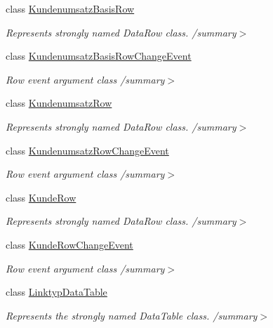 \begin{DoxyCompactItemize}
class \hyperlink{class_products_1_1_data_1_1ds_sage_1_1_kundenumsatz_basis_row}{Kundenumsatz\+Basis\+Row}
\begin{DoxyCompactList}\small\item\em Represents strongly named Data\+Row class. /summary$>$ \end{DoxyCompactList}\item 
class \hyperlink{class_products_1_1_data_1_1ds_sage_1_1_kundenumsatz_basis_row_change_event}{Kundenumsatz\+Basis\+Row\+Change\+Event}
\begin{DoxyCompactList}\small\item\em Row event argument class /summary$>$ \end{DoxyCompactList}\item 
class \hyperlink{class_products_1_1_data_1_1ds_sage_1_1_kundenumsatz_row}{Kundenumsatz\+Row}
\begin{DoxyCompactList}\small\item\em Represents strongly named Data\+Row class. /summary$>$ \end{DoxyCompactList}\item 
class \hyperlink{class_products_1_1_data_1_1ds_sage_1_1_kundenumsatz_row_change_event}{Kundenumsatz\+Row\+Change\+Event}
\begin{DoxyCompactList}\small\item\em Row event argument class /summary$>$ \end{DoxyCompactList}\item 
class \hyperlink{class_products_1_1_data_1_1ds_sage_1_1_kunde_row}{Kunde\+Row}
\begin{DoxyCompactList}\small\item\em Represents strongly named Data\+Row class. /summary$>$ \end{DoxyCompactList}\item 
class \hyperlink{class_products_1_1_data_1_1ds_sage_1_1_kunde_row_change_event}{Kunde\+Row\+Change\+Event}
\begin{DoxyCompactList}\small\item\em Row event argument class /summary$>$ \end{DoxyCompactList}\item 
class \hyperlink{class_products_1_1_data_1_1ds_sage_1_1_linktyp_data_table}{Linktyp\+Data\+Table}
\begin{DoxyCompactList}\small\item\em Represents the strongly named Data\+Table class. /summary$>$ \end{DoxyCompactList}\item 

\end{DoxyCompactItemize}
